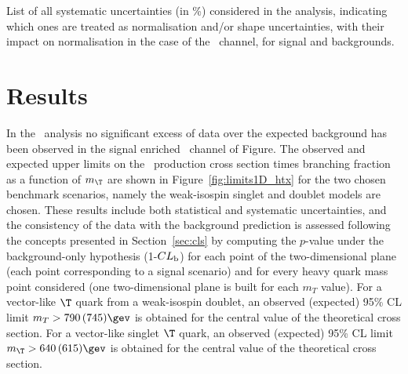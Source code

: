\begin{table}[h!tb]
\begin{center}
\resizebox{1.\textwidth}{!}{
}
\caption{List of all systematic uncertainties (in \%) considered in the analysis, indicating which ones are treated
as normalisation and/or shape uncertainties, with their impact on normalisation in the case of the 
\chiv\ channel, for signal and backgrounds. \label{tab:htxSYS4b} }
\end{center}
\end{table}






\section{Results}\label{sec:htxRES}

In the \htx\ analysis no significant excess of data over the 
expected background has been observed in the signal enriched 
\chiv\ channel of Figure.
The observed and expected upper limits on the \TTbar\ production cross section 
times branching fraction as a function of $m_{\T}$ are shown in 
Figure~\ref{fig:limits1D_htx} for the two chosen benchmark scenarios,
namely the weak-isospin singlet and
doublet models are chosen.
These results include both statistical and systematic uncertainties,
and the consistency of the data with the background prediction is 
assessed following the concepts presented in Section~\ref{sec:cls}
by computing the $p$-value under the background-only hypothesis
(1-$CL_{\rm b}$) for each point of the two-dimensional plane 
(each point corresponding to a signal scenario) and for every heavy 
quark mass point considered (one two-dimensional plane is built for each
$m_T$ value). For a vector-like $\T$ quark from a weak-isospin doublet, an observed (expected) 95\%  CL  limit
$m_{T}>790\,(745)\gev$ is obtained for the central value of the 
theoretical cross section.
For a vector-like singlet $\T$ quark, an observed (expected) 95\%  CL  limit 
$m_{\T}>640\,(615)\gev$ is obtained for the central value of the 
theoretical cross section.


